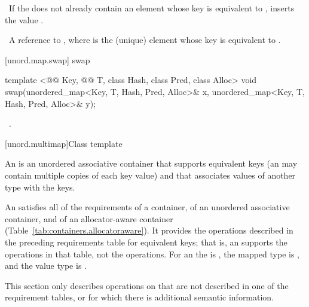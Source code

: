 \documentclass[american,twoside]{book}
\begin{document}
\begin{itemdescr}
\pnum
\effects\ If the  does not already contain
an element whose key is equivalent to , inserts 
the value
.

\pnum
\returns\ A reference to , where 
is the (unique) element whose key is equivalent to .
\end{itemdescr}

[unord.map.swap]{ swap}

%
%
\begin{itemdecl}
template <@@ Key, @@ T, class Hash, class Pred, class Alloc>
  void swap(unordered_map<Key, T, Hash, Pred, Alloc>& x,
            unordered_map<Key, T, Hash, Pred, Alloc>& y);
\end{itemdecl}

\begin{itemdescr}
\pnum\effects\ .
\end{itemdescr}

[unord.multimap]{Class template }
%

\pnum
{}%
%
An  is an unordered associative container
that supports equivalent keys (an  may contain
multiple copies of each key value) and that associates values of
another type  with the keys.

\pnum
An  satisfies all of the requirements of a container, of an unordered associative container, and of an allocator-aware container (Table~\ref{tab:containers.allocatoraware}). It provides the operations described in the preceding requirements table for equivalent keys; that is, an  supports the  operations in that table, not the  operations. For an  the  is , the mapped type is , and the value type is .

\pnum
This section only describes operations on 
that are not described in one of the requirement tables, or for which
there is additional semantic information.
\end{document}
